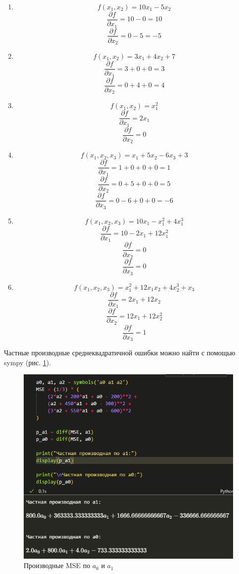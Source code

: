 \documentclass[14pt,a4paper]{extarticle}
\begin{document}
\begin{enumerate}
    \item 
    \[
    f(x_1, x_2) = 10x_1 - 5x_2
    \]
    \[
    \frac{\partial f}{\partial x_1} = 10 - 0 = 10
    \]
    \[
    \frac{\partial f}{\partial x_2} = 0 - 5 = -5
    \]

    \item 
    \[
    f(x_1, x_2) = 3x_1 + 4x_2 + 7
    \]
    \[
    \frac{\partial f}{\partial x_1} = 3 + 0 + 0 = 3
    \]
    \[
    \frac{\partial f}{\partial x_2} = 0 + 4 + 0 = 4
    \]

    \item 
    \[
    f(x_1, x_2) = x_1^2
    \]
    \[
    \frac{\partial f}{\partial x_1} = 2x_1
    \]
    \[
    \frac{\partial f}{\partial x_2} = 0
    \]

    \item 
    \[
    f(x_1, x_2, x_3) = x_1 + 5x_2 - 6x_3 + 3
    \]
    \[
    \frac{\partial f}{\partial x_1} = 1 + 0 + 0 + 0 = 1
    \]
    \[
    \frac{\partial f}{\partial x_2} = 0 + 5 + 0 + 0 = 5
    \]
    \[
    \frac{\partial f}{\partial x_3} = 0 - 6 + 0 + 0 = -6
    \]

    \item 
    \[
    f(x_1, x_2, x_3) = 10x_1 - x_1^2 + 4x_1^3
    \]
    \[
    \frac{\partial f}{\partial x_1} = 10 - 2x_1 + 12x_1^2
    \]
    \[
    \frac{\partial f}{\partial x_2} = 0
    \]
    \[
    \frac{\partial f}{\partial x_3} = 0
    \]

    \item 
    \[
    f(x_1, x_2, x_3) = x_1^2 + 12x_1x_2 + 4x_2^3 + x_3
    \]
    \[
    \frac{\partial f}{\partial x_1} = 2x_1 + 12x_2
    \]
    \[
    \frac{\partial f}{\partial x_2} = 12x_1 + 12x_2^2
    \]
    \[
    \frac{\partial f}{\partial x_3} = 1
    \]
\end{enumerate}

Частные производные среднеквадратичной ошибки можно найти с помощью sympy (рис. \ref{pic:mse}).

\begin{figure}[ht!]
    \centering
    \includegraphics[width=0.9\linewidth]{figures/3.png}
    \caption{Производные MSE по $a_0$ и $a_1$}
    \label{pic:mse}
\end{figure}
\end{document}
